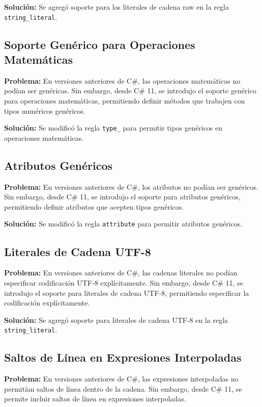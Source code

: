\textbf{Solución:} Se agregó soporte para los literales de cadena raw en la regla \texttt{string\_literal}.

\subsection{Soporte Genérico para Operaciones Matemáticas}

\textbf{Problema:} En versiones anteriores de C\#, las operaciones matemáticas no podían ser genéricas. Sin embargo, desde C\# 11, se introdujo el soporte genérico para operaciones matemáticas, permitiendo definir métodos que trabajen con tipos numéricos genéricos.

\textbf{Solución:} Se modificó la regla \texttt{type\_} para permitir tipos genéricos en operaciones matemáticas.

\subsection{Atributos Genéricos}

\textbf{Problema:} En versiones anteriores de C\#, los atributos no podían ser genéricos. Sin embargo, desde C\# 11, se introdujo el soporte para atributos genéricos, permitiendo definir atributos que acepten tipos genéricos.

\textbf{Solución:} Se modificó la regla \texttt{attribute} para permitir atributos genéricos.

\subsection{Literales de Cadena UTF-8}

\textbf{Problema:} En versiones anteriores de C\#, las cadenas literales no podían especificar codificación UTF-8 explícitamente. Sin embargo, desde C\# 11, se introdujo el soporte para literales de cadena UTF-8, permitiendo especificar la codificación explícitamente.

\textbf{Solución:} Se agregó soporte para literales de cadena UTF-8 en la regla \texttt{string\_literal}.

\subsection{Saltos de Línea en Expresiones Interpoladas}

\textbf{Problema:} En versiones anteriores de C\#, las expresiones interpoladas no permitían saltos de línea dentro de la cadena. Sin embargo, desde C\# 11, se permite incluir saltos de línea en expresiones interpoladas.

